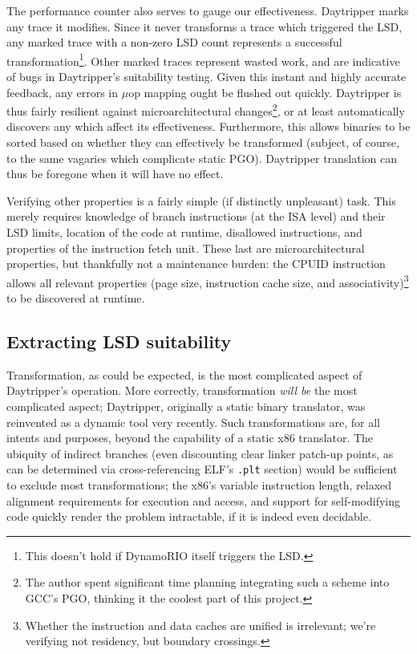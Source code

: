 \documentclass[]{sigplanconf}
\begin{document}
The performance counter also serves to gauge our effectiveness. Daytripper
marks any trace it modifies. Since it never transforms a trace which triggered
the LSD, any marked trace with a non-zero LSD count represents a successful
transformation\footnote{This doesn't hold if DynamoRIO itself triggers the LSD.}. Other marked traces represent wasted work, and are indicative
of bugs in Daytripper's suitability testing. Given this instant and highly
accurate feedback, any errors in $\mu$op mapping ought be flushed out quickly.
Daytripper is thus fairly resilient against microarchitectural changes\footnote{The
author spent significant time planning integrating such a scheme into GCC's PGO, thinking
it the coolest part of this project.}, or at least automatically discovers any
which affect its effectiveness. Furthermore, this allows binaries to be
sorted based on whether they can effectively be transformed (subject, of course,
to the same vagaries which complicate static PGO). Daytripper translation can
thus be foregone when it will have no effect.

Verifying other properties is a fairly simple (if distinctly unpleasant) task.
This merely requires knowledge of branch instructions (at the ISA level) and
their LSD limits, location of the code at runtime, disallowed instructions,
and properties of the instruction fetch unit. These last are microarchitectural
properties, but thankfully not a maintenance burden: the CPUID instruction
allows all relevant properties (page size, instruction cache size, and
associativity)\footnote{Whether the instruction and data caches are unified is irrelevant;
we're verifying not residency, but boundary crossings.} to be discovered
at runtime.

\subsection{Extracting LSD suitability}
Transformation, as could be expected, is the most complicated aspect of
Daytripper's operation. More correctly, transformation \textit{will be} the
most complicated aspect; Daytripper, originally a static binary translator,
was reinvented as a dynamic tool very recently. Such transformations are, for
all intents and purposes, beyond the capability of a static x86 translator.
The ubiquity of indirect branches (even discounting clear linker patch-up points,
as can be determined via cross-referencing ELF's \texttt{.plt} section) would
be sufficient to exclude most transformations\cite{landi}; the x86's variable
instruction length, relaxed alignment requirements for execution and access,
and support for self-modifying code quickly render the problem intractable,
if it is indeed even decidable.
\end{document}
